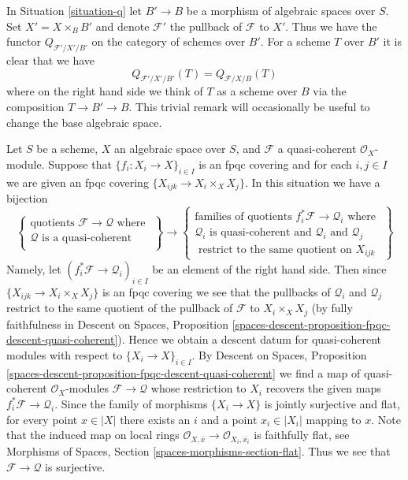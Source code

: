 \begin{remark}
\label{remark-q-base-change}
In Situation \ref{situation-q} let $B' \to B$ be a morphism of
algebraic spaces over $S$. Set $X' = X \times_B B'$ and denote
$\mathcal{F}'$ the pullback of $\mathcal{F}$ to $X'$.
Thus we have the functor $Q_{\mathcal{F}'/X'/B'}$ on
the category of schemes over $B'$. For a scheme $T$ over $B'$
it is clear that we have
$$
Q_{\mathcal{F}'/X'/B'}(T) = Q_{\mathcal{F}/X/B}(T)
$$
where on the right hand side we think of $T$ as a scheme over $B$
via the composition $T \to B' \to B$. This trivial remark
will occasionally be useful to change the base algebraic space.
\end{remark}

\begin{remark}
\label{remark-q-sheaf}
Let $S$ be a scheme, $X$ an algebraic space over $S$, and $\mathcal{F}$
a quasi-coherent $\mathcal{O}_X$-module. Suppose that
$\{f_i : X_i \to X\}_{i \in I}$
is an fpqc covering and for each $i, j \in I$ we are given an fpqc covering
$\{X_{ijk} \to X_i \times_X X_j\}$. In this situation we have a bijection
$$
\left\{
\begin{matrix}
\text{quotients }\mathcal{F} \to \mathcal{Q}\text{ where } \\
\mathcal{Q}\text{ is a quasi-coherent }\\
\end{matrix}
\right\}
\longrightarrow
\left\{
\begin{matrix}
\text{families of quotients }f_i^*\mathcal{F} \to \mathcal{Q}_i
\text{ where } \\
\mathcal{Q}_i\text{ is quasi-coherent and }
\mathcal{Q}_i\text{ and }\mathcal{Q}_j\\
\text{ restrict to the same quotient on }X_{ijk}
\end{matrix}
\right\}
$$
Namely, let $(f_i^*\mathcal{F} \to \mathcal{Q}_i)_{i \in I}$
be an element of the right hand side. Then since
$\{X_{ijk} \to X_i \times_X X_j\}$ is an fpqc covering we see that
the pullbacks of $\mathcal{Q}_i$ and $\mathcal{Q}_j$ restrict
to the same quotient of the pullback of $\mathcal{F}$ to $X_i \times_X X_j$
(by fully faithfulness in
Descent on Spaces, Proposition
\ref{spaces-descent-proposition-fpqc-descent-quasi-coherent}).
Hence we obtain a descent datum for quasi-coherent modules
with respect to $\{X_i \to X\}_{i \in I}$. By
Descent on Spaces, Proposition
\ref{spaces-descent-proposition-fpqc-descent-quasi-coherent}
we find a map of quasi-coherent $\mathcal{O}_X$-modules
$\mathcal{F} \to \mathcal{Q}$ whose restriction to $X_i$ recovers
the given maps $f_i^*\mathcal{F} \to \mathcal{Q}_i$.
Since the family of morphisms $\{X_i \to X\}$ is jointly surjective
and flat, for every point $x \in |X|$ there exists an $i$ and a point
$x_i \in |X_i|$ mapping to $x$. Note that the induced map on
local rings
$\mathcal{O}_{X, \overline{x}} \to \mathcal{O}_{X_i, \overline{x_i}}$
is faithfully flat, see
Morphisms of Spaces, Section \ref{spaces-morphisms-section-flat}.
Thus we see that $\mathcal{F} \to \mathcal{Q}$ is surjective.
\end{remark}

